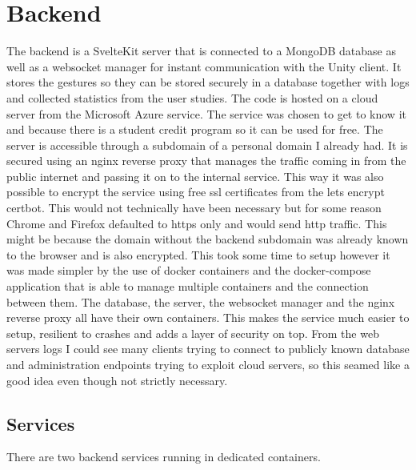 




\chapter{Backend}

The backend is a SvelteKit server that is connected to a MongoDB database as well as a websocket manager for instant communication with the Unity client. It stores the gestures so they can be stored securely in a database together with logs and collected statistics from the user studies. The code is hosted on a cloud server from the Microsoft Azure service. The service was chosen to get to know it and because there is a student credit program so it can be used for free. The server is accessible through a subdomain of a personal domain I already had. It is secured using an nginx reverse proxy that manages the traffic coming in from the public internet and passing it on to the internal service. This way it was also possible to encrypt the service using free ssl certificates from the lets encrypt certbot. This would not technically have been necessary but for some reason Chrome and Firefox defaulted to https only and would send http traffic. This might be because the domain without the backend subdomain was already known to the browser and is also encrypted. This took some time to setup however it was made simpler by the use of docker containers and the docker-compose application that is able to manage multiple containers and the connection between them. The database, the server, the websocket manager and the nginx reverse proxy all have their own containers. This makes the service much easier to setup, resilient to crashes and adds a layer of security on top. From the web servers logs I could see many clients trying to connect to publicly known database and administration endpoints trying to exploit cloud servers, so this seamed like a good idea even though not strictly necessary. 

\section{Services}
There are two backend services running in dedicated containers.

